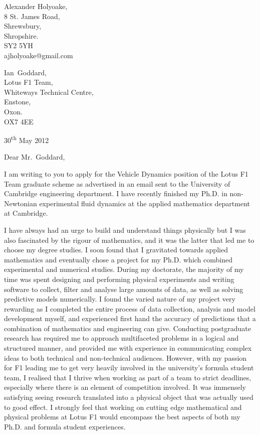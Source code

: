 \documentclass[a4paper,10pt]{article}
\newcommand{\sendfirst}{Ian}
\newcommand{\sendlast}{Goddard}
\newcommand{\sendtitle}{Mr.}
\newcommand{\sendto}{\sendfirst\ \sendlast}
\begin{document}
\begin{flushright}
Alexander Holyoake, \\ 8 St. James Road, \\ Shrewsbury, \\ Shropshire. \\ SY2 5YH \\ ajholyoake@gmail.com
\end{flushright}

\begin{flushleft} 
\sendto, \\ Lotus F1 Team, \\ Whiteways Technical Centre, \\ Enstone, \\ Oxon. \\ OX7 4EE
\end{flushleft}

\begin{flushright}
30\textsuperscript{th} May 2012
\end{flushright}


\noindent Dear \sendtitle\ \sendlast,

I am writing to you to apply for the Vehicle Dynamics position of the Lotus F1 Team graduate scheme as advertised in an email sent to the University of Cambridge engineering department. I have recently finished my Ph.D. in non-Newtonian experimental fluid dynamics at the applied mathematics department at Cambridge. 

I have always had an urge to build and understand things physically but I was also fascinated by the rigour of mathematics, and it was the latter that led me to choose my degree studies. I soon found that  I gravitated towards applied mathematics and eventually chose a project for my Ph.D. which combined experimental and numerical studies. During my doctorate, the majority of my time was spent designing and performing physical experiments and writing software to collect, filter and analyse large amounts of data, as well as solving predictive models numerically. I found the varied nature of my project very rewarding as I completed the entire process of data collection, analysis and model development myself, and experienced first hand the accuracy of predictions that a combination of mathematics and engineering can give. Conducting postgraduate research has required me to approach multifaceted problems in a logical and structured manner, and provided me with experience in communicating complex ideas to both technical and non-technical audiences. However, with my passion for F1 leading me to get very heavily involved in the university's formula student team, I realised that I thrive when working as part of a team to strict deadlines, especially where there is an element of competition involved. It was immensely satisfying seeing research translated into a physical object that was actually used to good effect. I strongly feel that working on cutting edge mathematical and physical problems at Lotus F1 would encompass the best aspects of both my Ph.D. and formula student experiences.
\end{document}
